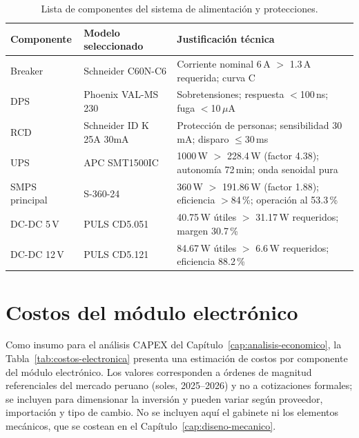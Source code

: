 \begin{table}[H]
  \centering
  \caption{Lista de componentes del sistema de alimentación y protecciones.}
  \label{tab:lista-alimentacion}
  \footnotesize
  \begin{tabular}{@{}p{2.6cm}p{3.4cm}p{7.5cm}@{}}
    \toprule
    \textbf{Componente} & \textbf{Modelo seleccionado} & \textbf{Justificación técnica}\\
    \midrule
    Breaker & Schneider C60N-C6 & Corriente nominal 6\,A $>$ 1.3\,A requerida; curva C\\
    DPS & Phoenix VAL-MS 230 & Sobretensiones; respuesta $<$100\,ns; fuga $<$10\,\ensuremath{\mu}A\\
    RCD & Schneider ID K 25A 30mA & Protección de personas; sensibilidad 30\,mA; disparo $\leq$30\,ms\\
    UPS & APC SMT1500IC & 1000\,W $>$ 228.4\,W (factor 4.38); autonomía 72\,min; onda senoidal pura\\
    SMPS principal & S-360-24 & 360\,W $>$ 191.86\,W (factor 1.88); eficiencia $>$84\,\%; operación al 53.3\,\%\\
    DC-DC 5\,V & PULS CD5.051 & 40.75\,W útiles $>$ 31.17\,W requeridos; margen 30.7\,\%\\
    DC-DC 12\,V & PULS CD5.121 & 84.67\,W útiles $>$ 6.6\,W requeridos; eficiencia 88.2\,\%\\
    \bottomrule
  \end{tabular}
\end{table}

\section{Costos del módulo electrónico}\label{sec:costos-electronico}

Como insumo para el análisis CAPEX del Capítulo~\ref{cap:analisis-economico}, la
Tabla~\ref{tab:costos-electronica} presenta una estimación de costos por componente del módulo electrónico.
Los valores corresponden a órdenes de magnitud referenciales del mercado peruano (soles, 2025--2026) y no a
cotizaciones formales; se incluyen para dimensionar la inversión y pueden variar según proveedor, importación
y tipo de cambio. No se incluyen aquí el gabinete ni los elementos mecánicos, que se costean en el
Capítulo~\ref{cap:diseno-mecanico}.

